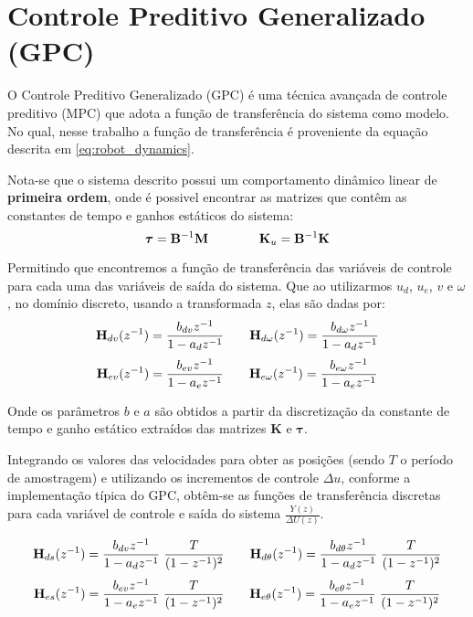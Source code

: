 \section{Controle Preditivo Generalizado (GPC)}

O Controle Preditivo Generalizado (GPC) é uma 
técnica avançada de controle preditivo (MPC) 
que adota a função de transferência do sistema 
como modelo. No qual, nesse trabalho a função de transferência é proveniente 
da equação descrita em \ref{eq:robot_dynamics}.

\vspace{1em}
Nota-se que o sistema descrito possui um comportamento dinâmico linear de
\textbf{primeira ordem}, onde é possivel encontrar as matrizes que contêm 
as constantes de tempo e ganhos estáticos do sistema:
\begin{equation}
\boldsymbol{\tau} = \mathbf{B}^{-1} \mathbf{M} \\
\qquad
\qquad
\mathbf{K}_u = \mathbf{B}^{-1} \mathbf{K}
\end{equation}

Permitindo que encontremos a função de transferência das variáveis 
de controle para cada uma das variáveis de saída do sistema. 
Que ao utilizarmos $u_d$, $u_e$, $v$ e $\omega$,
no domínio discreto, usando a transformada $z$, elas são dadas por:
\[
\mathbf{H}_{d v}(z^{-1}) = \frac{b_{d v} z^{-1}}{1 - a_{d} z^{-1}} \\
\qquad
\mathbf{H}_{d \omega}(z^{-1}) = \frac{b_{d \omega} z^{-1}}{1 - a_{d} z^{-1}} \\
\]
\[
\mathbf{H}_{e v}(z^{-1}) = \frac{b_{e v} z^{-1}}{1 - a_{e} z^{-1}} \\
\qquad
\mathbf{H}_{e \omega}(z^{-1}) = \frac{b_{e \omega} z^{-1}}{1 - a_{e} z^{-1}}
\]

Onde os parâmetros $b$ e $a$ são obtidos a partir da discretização 
da constante de tempo e ganho estático extraídos das matrizes
$\mathbf{K}$ e $\boldsymbol{\tau}$.

\vspace{1em}
Integrando os valores das velocidades para obter as posições 
(sendo $T$ o período de amostragem) e utilizando os incrementos 
de controle $\Delta u$, conforme a implementação típica do GPC, 
obtêm-se as funções de transferência discretas para cada variável 
de controle e saída do sistema $\frac{Y(z)}{\Delta U(z)}$.

\[
\mathbf{H}_{d s}(z^{-1}) = \frac{b_{d v} z^{-1}}{1 - a_{d} z^{-1}} \; \frac{T}{(1 - z^{-1})^2}\\
\qquad
\mathbf{H}_{d \theta}(z^{-1}) = \frac{b_{d \theta} z^{-1}}{1 - a_{d} z^{-1}} \; \frac{T}{(1 - z^{-1})^2}\\
\]
\[
\mathbf{H}_{e s}(z^{-1}) = \frac{b_{e v} z^{-1}}{1 - a_{e} z^{-1}} \; \frac{T}{(1 - z^{-1})^2}\\
\qquad
\mathbf{H}_{e \theta}(z^{-1}) = \frac{b_{e \theta} z^{-1}}{1 - a_{e} z^{-1}} \; \frac{T}{(1 - z^{-1})^2}
\]

